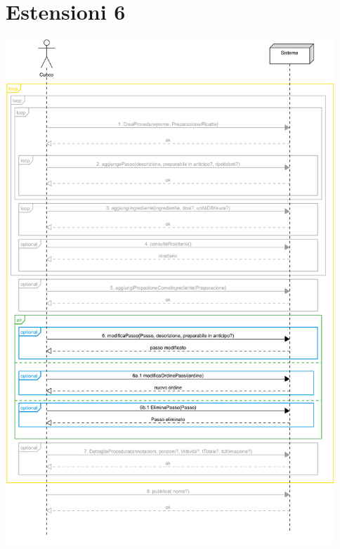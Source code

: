 \section*{Estensioni 6}
\includegraphics[max width=\textwidth, max height=190mm]{../resources/img/GRP/SSD/ext6.png}

